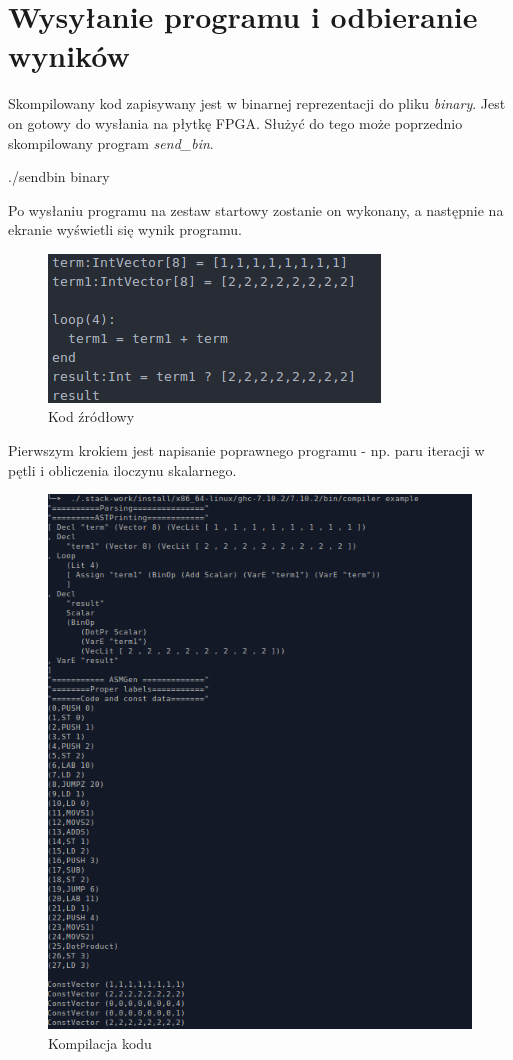 \section{Wysyłanie programu i odbieranie wyników}
Skompilowany kod zapisywany jest w binarnej reprezentacji do pliku \textit{binary}. Jest on gotowy do wysłania na płytkę FPGA. Służyć do tego może poprzednio skompilowany program \textit{send\_bin}.
\begin{center}
./sendbin binary
\end{center} 
Po wysłaniu programu na zestaw startowy zostanie on wykonany, a następnie na ekranie wyświetli się wynik programu.
\begin{figure}[H]
\centering
\includegraphics[scale=0.75]{images/exec1}
\caption{Kod źródłowy}
\end{figure}
Pierwszym krokiem jest napisanie poprawnego programu - np. paru iteracji w pętli i obliczenia iloczynu skalarnego.
\begin{figure}[H]
\centering
\includegraphics[scale=0.75]{images/exec2}
\caption{Kompilacja kodu}
\end{figure}
